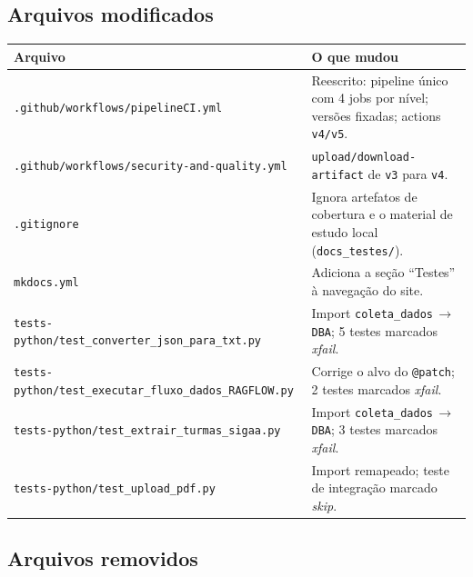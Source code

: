 \documentclass[11pt,a4paper]{article}
\begin{document}
\subsection{Arquivos modificados}

\begin{table}[h]
\centering
\small
\begin{tabular}{@{}p{6.8cm}p{7.5cm}@{}}
\toprule
\textbf{Arquivo} & \textbf{O que mudou} \\
\midrule
\texttt{.github/workflows/pipelineCI.yml} & Reescrito: pipeline único com 4 jobs por nível; versões fixadas; actions \texttt{v4/v5}. \\
\texttt{.github/workflows/security-and-quality.yml} & \texttt{upload/download-artifact} de \texttt{v3} para \texttt{v4}. \\
\texttt{.gitignore} & Ignora artefatos de cobertura e o material de estudo local (\texttt{docs\_testes/}). \\
\texttt{mkdocs.yml} & Adiciona a seção ``Testes'' à navegação do site. \\
\texttt{tests-python/test\_converter\_json\_para\_txt.py} & Import \texttt{coleta\_dados}\,$\rightarrow$\,\texttt{DBA}; 5 testes marcados \emph{xfail}. \\
\texttt{tests-python/test\_executar\_fluxo\_dados\_RAGFLOW.py} & Corrige o alvo do \texttt{@patch}; 2 testes marcados \emph{xfail}. \\
\texttt{tests-python/test\_extrair\_turmas\_sigaa.py} & Import \texttt{coleta\_dados}\,$\rightarrow$\,\texttt{DBA}; 3 testes marcados \emph{xfail}. \\
\texttt{tests-python/test\_upload\_pdf.py} & Import remapeado; teste de integração marcado \emph{skip}. \\
\bottomrule
\end{tabular}
\end{table}

\subsection{Arquivos removidos}
\end{document}
